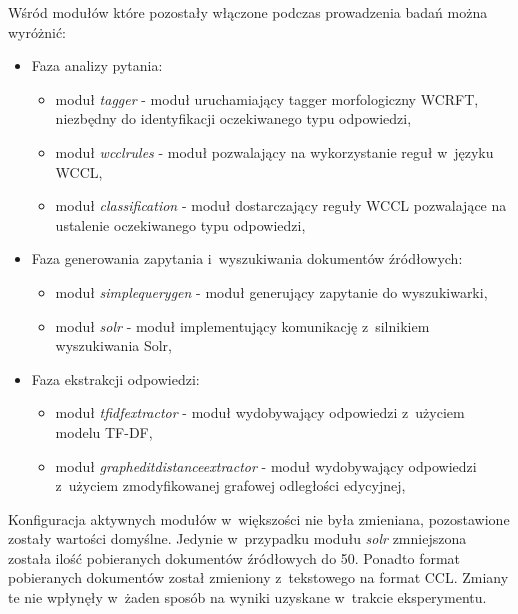 \documentclass[a4paper, twoside, openright, 12pt]{report}
\begin{document}
        Wśród modułów które pozostały włączone podczas prowadzenia badań można wyróżnić:
        \begin{itemize}
            \item Faza analizy pytania:
                \begin{itemize}
                    \item moduł \emph{tagger} - moduł uruchamiający tagger morfologiczny WCRFT, niezbędny do identyfikacji
                        oczekiwanego typu odpowiedzi,
                    \item moduł \emph{wcclrules} - moduł pozwalający na wykorzystanie reguł w~języku WCCL,
                    \item moduł \emph{classification} - moduł dostarczający reguły WCCL pozwalające na ustalenie oczekiwanego
                        typu odpowiedzi,
                \end{itemize}
            \item Faza generowania zapytania i~wyszukiwania dokumentów źródłowych:
                \begin{itemize}
                    \item moduł \emph{simplequerygen} - moduł generujący zapytanie do wyszukiwarki,
                    \item moduł \emph{solr} - moduł implementujący komunikację z~silnikiem wyszukiwania Solr,
                \end{itemize}
            \item Faza ekstrakcji odpowiedzi:
                \begin{itemize}
                    \item moduł \emph{tfidfextractor} - moduł wydobywający odpowiedzi z~użyciem modelu TF-DF,
                    \item moduł \emph{grapheditdistanceextractor} - moduł wydobywający odpowiedzi z~użyciem zmodyfikowanej
                        grafowej odległości edycyjnej,
                \end{itemize}
        \end{itemize}

        Konfiguracja aktywnych modułów w~większości nie była zmieniana, pozostawione zostały wartości domyślne. Jedynie
        w~przypadku modułu \emph{solr} zmniejszona została ilość pobieranych dokumentów źródłowych do 50. Ponadto
        format pobieranych dokumentów został zmieniony z~tekstowego na format CCL. Zmiany te nie wpłynęły w~żaden
        sposób na wyniki uzyskane w~trakcie eksperymentu.
\end{document}
